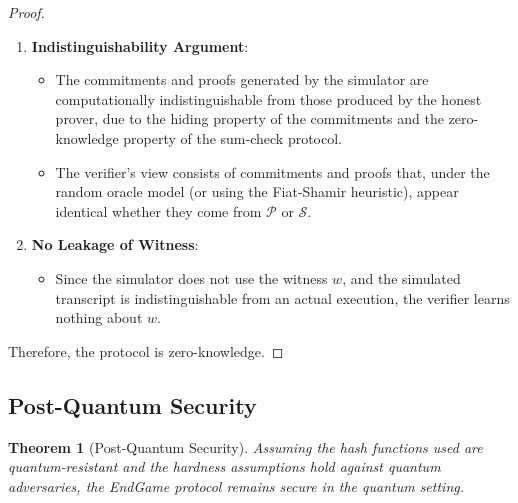\documentclass{article}
\theoremstyle{plain}
\newtheorem{theorem}{Theorem}[section]
\theoremstyle{definition}
\theoremstyle{remark}
\theoremstyle{problem}
\begin{document}
\begin{proof}
\begin{enumerate}
    \item \textbf{Indistinguishability Argument}:
    \begin{itemize}
        \item The commitments and proofs generated by the simulator are computationally indistinguishable from those produced by the honest prover, due to the hiding property of the commitments and the zero-knowledge property of the sum-check protocol.
        \item The verifier's view consists of commitments and proofs that, under the random oracle model (or using the Fiat-Shamir heuristic), appear identical whether they come from \(\mathcal{P}\) or \(\mathcal{S}\).
    \end{itemize}

    \item \textbf{No Leakage of Witness}:
    \begin{itemize}
        \item Since the simulator does not use the witness \(w\), and the simulated transcript is indistinguishable from an actual execution, the verifier learns nothing about \(w\).
    \end{itemize}
\end{enumerate}

Therefore, the protocol is zero-knowledge.
\end{proof}

\subsection{Post-Quantum Security}

\begin{theorem}[Post-Quantum Security]
\label{thm:post-quantum}
Assuming the hash functions used are quantum-resistant and the hardness assumptions hold against quantum adversaries, the EndGame protocol remains secure in the quantum setting.
\end{theorem}
\end{document}
